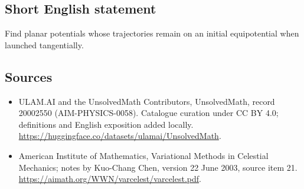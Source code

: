 \documentclass[11pt]{article}
\begin{document}
\subsection{Short English statement}
Find planar potentials whose trajectories remain on an initial equipotential when launched tangentially.
\subsection{Sources}
\begin{itemize}
\item[\hypertarget{source:20002550:1}{S1}] ULAM.AI and the UnsolvedMath Contributors, UnsolvedMath, record 20002550 (AIM-PHYSICS-0058). Catalogue curation under CC BY 4.0; definitions and English exposition added locally.
\url{https://huggingface.co/datasets/ulamai/UnsolvedMath}.
\item[\hypertarget{source:20002550:2}{S2}] American Institute of Mathematics, Variational Methods in Celestial Mechanics; notes by Kuo-Chang Chen, version 22 June 2003, source item 21.
\url{https://aimath.org/WWN/varcelest/varcelest.pdf}.
\end{itemize}
\label{end:20002550}
\end{document}
